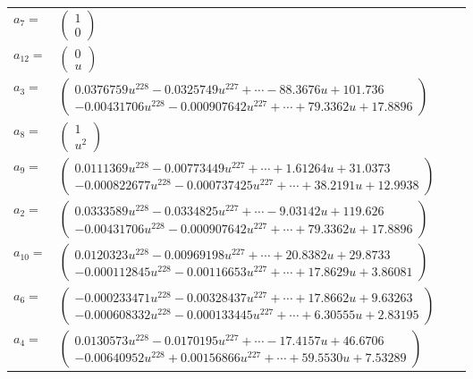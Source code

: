 \documentclass[1p]{elsarticle_modified}
\theoremstyle{definition}
\begin{document}
\begin{tabular}{m{7pt} m{180pt} m{7pt} m{180pt} }
\flushright $a_{7}=$&$\begin{pmatrix}1\\0\end{pmatrix}$ \\
\flushright $a_{12}=$&$\begin{pmatrix}0\\u\end{pmatrix}$ \\
\flushright $a_{3}=$&$\begin{pmatrix}0.0376759 u^{228}-0.0325749 u^{227}+\cdots-88.3676 u+101.736\\-0.00431706 u^{228}-0.000907642 u^{227}+\cdots+79.3362 u+17.8896\end{pmatrix}$ \\
\flushright $a_{8}=$&$\begin{pmatrix}1\\u^2\end{pmatrix}$ \\
\flushright $a_{9}=$&$\begin{pmatrix}0.0111369 u^{228}-0.00773449 u^{227}+\cdots+1.61264 u+31.0373\\-0.000822677 u^{228}-0.000737425 u^{227}+\cdots+38.2191 u+12.9938\end{pmatrix}$ \\
\flushright $a_{2}=$&$\begin{pmatrix}0.0333589 u^{228}-0.0334825 u^{227}+\cdots-9.03142 u+119.626\\-0.00431706 u^{228}-0.000907642 u^{227}+\cdots+79.3362 u+17.8896\end{pmatrix}$ \\
\flushright $a_{10}=$&$\begin{pmatrix}0.0120323 u^{228}-0.00969198 u^{227}+\cdots+20.8382 u+29.8733\\-0.000112845 u^{228}-0.00116653 u^{227}+\cdots+17.8629 u+3.86081\end{pmatrix}$ \\
\flushright $a_{6}=$&$\begin{pmatrix}-0.000233471 u^{228}-0.00328437 u^{227}+\cdots+17.8662 u+9.63263\\-0.000608332 u^{228}-0.000133445 u^{227}+\cdots+6.30555 u+2.83195\end{pmatrix}$ \\
\flushright $a_{4}=$&$\begin{pmatrix}0.0130573 u^{228}-0.0170195 u^{227}+\cdots-17.4157 u+46.6706\\-0.00640952 u^{228}+0.00156866 u^{227}+\cdots+59.5530 u+7.53289\end{pmatrix}$ \\

\end{tabular}
\end{document}
